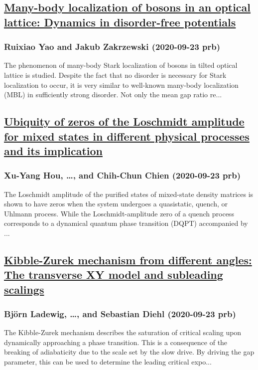 \subsection*{\href{http://link.aps.org/doi/10.1103/PhysRevB.102.104203}{Many-body localization of bosons in an optical lattice: Dynamics in disorder-free potentials}}
\subsubsection*{Ruixiao Yao and Jakub Zakrzewski (2020-09-23 prb)}
The phenomenon of many-body Stark localization of bosons in tilted optical lattice is studied. Despite the fact that no disorder is necessary for Stark localization to occur, it is very similar to well-known many-body localization (MBL) in sufficiently strong disorder. Not only the mean gap ratio re...
\subsection*{\href{http://link.aps.org/doi/10.1103/PhysRevB.102.104305}{Ubiquity of zeros of the Loschmidt amplitude for mixed states in different physical processes and its implication}}
\subsubsection*{Xu-Yang Hou, \dots, and Chih-Chun Chien (2020-09-23 prb)}
The Loschmidt amplitude of the purified states of mixed-state density matrices is shown to have zeros when the system undergoes a quasistatic, quench, or Uhlmann process. While the Loschmidt-amplitude zero of a quench process corresponds to a dynamical quantum phase transition (DQPT) accompanied by ...
\subsection*{\href{http://link.aps.org/doi/10.1103/PhysRevB.102.104306}{Kibble-Zurek mechanism from different angles: The transverse XY model and subleading scalings}}
\subsubsection*{Björn Ladewig, \dots, and Sebastian Diehl (2020-09-23 prb)}
The Kibble-Zurek mechanism describes the saturation of critical scaling upon dynamically approaching a phase transition. This is a consequence of the breaking of adiabaticity due to the scale set by the slow drive. By driving the gap parameter, this can be used to determine the leading critical expo...
\clearpage
